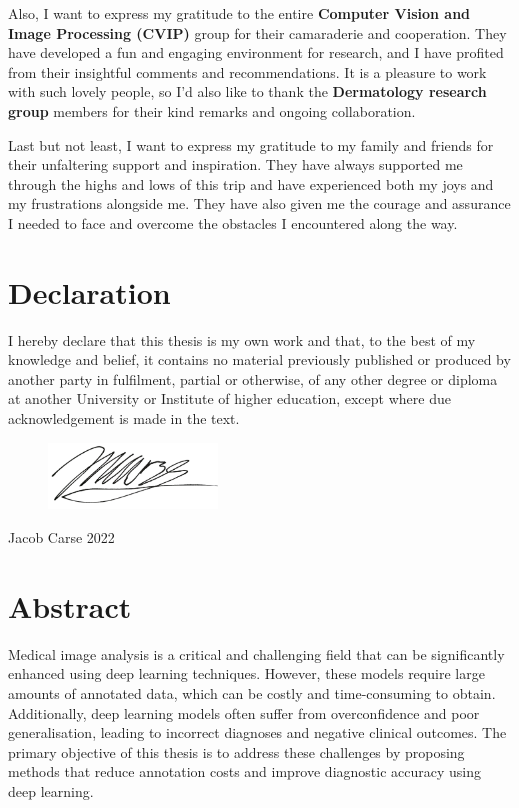 \documentclass[12pt]{report}
\begin{document}
	Also, I want to express my gratitude to the entire \textbf{Computer Vision and Image Processing (CVIP)} group for their camaraderie and cooperation. They have developed a fun and engaging environment for research, and I have profited from their insightful comments and recommendations. It is a pleasure to work with such lovely people, so I'd also like to thank the \textbf{Dermatology research group} members for their kind remarks and ongoing collaboration.
	
	Last but not least, I want to express my gratitude to my family and friends for their unfaltering support and inspiration. They have always supported me through the highs and lows of this trip and have experienced both my joys and my frustrations alongside me. They have also given me the courage and assurance I needed to face and overcome the obstacles I encountered along the way.
	
	\newpage
	\chapter*{Declaration}
	I hereby declare that this thesis is my own work and that, to the best of my knowledge and belief, it contains no material previously published or produced by another party in fulfilment, partial or otherwise, of any other degree or diploma at another University or Institute of higher education, except where due acknowledgement is made in the text.
	
	\vspace{30pt}
	\begin{flushright}
		\begin{figure}[h]
			\begin{flushright}
				\includegraphics[width=0.4\textwidth]{images/signature.png}
			\end{flushright}
		\end{figure}
	
		Jacob Carse
		2022
	
	\end{flushright}

	\newpage
	\chapter*{Abstract}
	Medical image analysis is a critical and challenging field that can be significantly enhanced using deep learning techniques. However, these models require large amounts of annotated data, which can be costly and time-consuming to obtain. Additionally, deep learning models often suffer from overconfidence and poor generalisation, leading to incorrect diagnoses and negative clinical outcomes. The primary objective of this thesis is to address these challenges by proposing methods that reduce annotation costs and improve diagnostic accuracy using deep learning.
	
\end{document}

